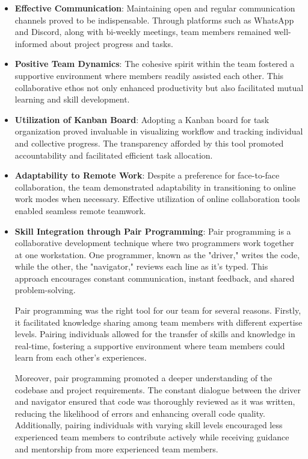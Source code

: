 \begin{itemize}
    \item \textbf{Effective Communication}: Maintaining open and regular communication channels proved to be indispensable. Through platforms such as WhatsApp and Discord, along with bi-weekly meetings, team members remained well-informed about project progress and tasks.

    \item \textbf{Positive Team Dynamics}: The cohesive spirit within the team fostered a supportive environment where members readily assisted each other. This collaborative ethos not only enhanced productivity but also facilitated mutual learning and skill development.

    \item \textbf{Utilization of Kanban Board}: Adopting a Kanban board for task organization proved invaluable in visualizing workflow and tracking individual and collective progress. The transparency afforded by this tool promoted accountability and facilitated efficient task allocation.

    \item \textbf{Adaptability to Remote Work}: Despite a preference for face-to-face collaboration, the team demonstrated adaptability in transitioning to online work modes when necessary. Effective utilization of online collaboration tools enabled seamless remote teamwork.

    \item \textbf{Skill Integration through Pair Programming}: Pair programming is a collaborative development technique where two programmers work together at one workstation. One programmer, known as the "driver," writes the code, while the other, the "navigator," reviews each line as it's typed. This approach encourages constant communication, instant feedback, and shared problem-solving.

    Pair programming was the right tool for our team for several reasons. Firstly, it facilitated knowledge sharing among team members with different expertise levels. Pairing individuals allowed for the transfer of skills and knowledge in real-time, fostering a supportive environment where team members could learn from each other's experiences.

    Moreover, pair programming promoted a deeper understanding of the codebase and project requirements. The constant dialogue between the driver and navigator ensured that code was thoroughly reviewed as it was written, reducing the likelihood of errors and enhancing overall code quality. Additionally, pairing individuals with varying skill levels encouraged less experienced team members to contribute actively while receiving guidance and mentorship from more experienced team members.
\end{itemize}


